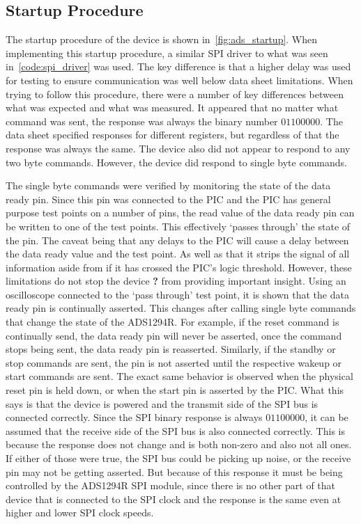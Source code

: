\subsection{Startup Procedure}
The startup procedure of the device is shown in~\autoref{fig:ads_startup}.
When implementing this startup procedure, a similar SPI driver to what was seen in~\autoref{code:spi_driver} was used.
The key difference is that a higher delay was used for testing to ensure communication was well below data sheet limitations.
When trying to follow this procedure, there were a number of key differences between what was expected and what was measured.
It appeared that no matter what command was sent, the response was always the binary number \(01100000\).
The data sheet specified responses for different registers, but regardless of that the response was always the same.
The device also did not appear to respond to any two byte commands.
However, the device did respond to single byte commands.

The single byte commands were verified by monitoring the state of the data ready pin.
Since this pin was connected to the PIC and the PIC has general purpose test points on a number of pins,
the read value of the data ready pin can be written to one of the test points.
This effectively `passes through' the state of the pin.
The caveat being that any delays to the PIC will cause a delay between the data ready value and the test point.
As well as that it strips the signal of all information aside from if it has crossed the PIC's logic threshold.
However, these limitations do not stop the device \textbf{?} from providing important insight.
Using an oscilloscope connected to the `pass through' test point, it is shown that the data ready pin is continually asserted.
This changes after calling single byte commands that change the state of the ADS1294R.
For example, if the reset command is continually send, the data ready pin will never be asserted,
once the command stops being sent, the data ready pin is reasserted.
Similarly, if the standby or stop commands are sent, the pin is not asserted until the respective wakeup or start commands are sent.
The exact same behavior is observed when the physical reset pin is held down, or when the start pin is asserted by the PIC.
What this says is that the device is powered and the transmit side of the SPI bus is connected correctly.
Since the SPI binary response is always \(01100000\), it can be assumed that the receive side of the SPI bus is also connected correctly.
This is because the response does not change and is both non-zero and also not all ones.
If either of those were true, the SPI bus could be picking up noise, or the receive pin may not be getting asserted.
But because of this response it must be being controlled by the ADS1294R SPI module,
since there is no other part of that device that is connected to the SPI clock and the response is the same even at higher and lower SPI clock speeds.

